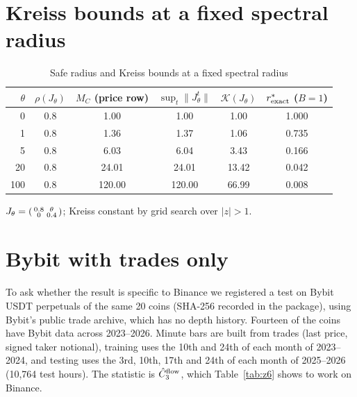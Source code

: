 \documentclass[12pt]{article}
\theoremstyle{definition}
\theoremstyle{remark}
\begin{document}
\section{Kreiss bounds at a fixed spectral radius}
\begin{table}[t]\centering\small
\begin{threeparttable}
\caption{Safe radius and Kreiss bounds at a fixed spectral radius}\label{tab:kreiss}
\begin{tabular}{rccccc}
\toprule
$\theta$ & $\rho(J_\theta)$ & $M_C$ (price row) & $\sup_t\|J_\theta^t\|$ & $\mathcal K(J_\theta)$ & $r^*_{\rm exact}$ ($B=1$)\\
\midrule
0 & 0.8 & 1.00 & 1.00 & 1.00 & 1.000\\
1 & 0.8 & 1.36 & 1.37 & 1.06 & 0.735\\
5 & 0.8 & 6.03 & 6.04 & 3.43 & 0.166\\
20 & 0.8 & 24.01 & 24.01 & 13.42 & 0.042\\
100 & 0.8 & 120.00 & 120.00 & 66.99 & 0.008\\
\bottomrule
\end{tabular}
\begin{tablenotes}\footnotesize\item $J_\theta=\begin{psmallmatrix}0.8&\theta\\0&0.4\end{psmallmatrix}$; Kreiss constant by grid search over $|z|>1$. \end{tablenotes}
\end{threeparttable}
\end{table}
\section{Bybit with trades only}
To ask whether the result is specific to Binance we registered a test on Bybit USDT perpetuals of the same 20 coins (SHA-256 recorded in the package), using Bybit's public trade archive, which has no depth history. Fourteen of the coins have Bybit data across 2023--2026. Minute bars are built from trades (last price, signed taker notional), training uses the 10th and 24th of each month of 2023--2024, and testing uses the 3rd, 10th, 17th and 24th of each month of 2025--2026 (10{,}764 test hours). The statistic is $\hat C_3^{\rm flow}$, which Table~\ref{tab:z6} shows to work on Binance.
\end{document}
